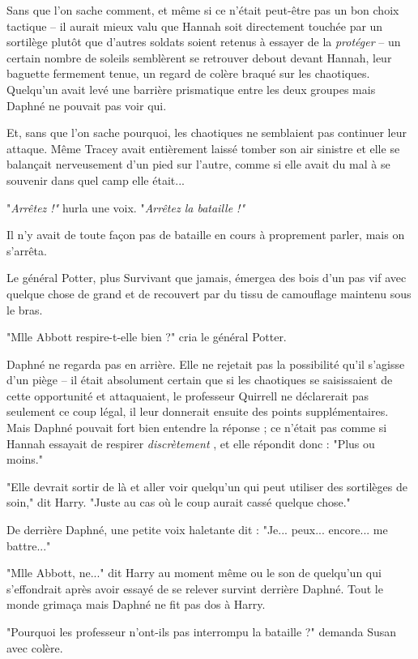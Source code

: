 Sans que l'on sache comment, et même si ce n'était peut-être pas un bon choix tactique – il aurait mieux valu que Hannah soit directement touchée par un sortilège plutôt que d'autres soldats soient retenus à essayer de la \emph{protéger}  – un certain nombre de soleils semblèrent se retrouver debout devant Hannah, leur baguette fermement tenue, un regard de colère braqué sur les chaotiques. Quelqu'un avait levé une barrière prismatique entre les deux groupes mais Daphné ne pouvait pas voir qui.

Et, sans que l'on sache pourquoi, les chaotiques ne semblaient pas continuer leur attaque. Même Tracey avait entièrement laissé tomber son air sinistre et elle se balançait nerveusement d'un pied sur l'autre, comme si elle avait du mal à se souvenir dans quel camp elle était...

"\emph{Arrêtez !"}  hurla une voix. "\emph{Arrêtez la bataille !"} 

Il n'y avait de toute façon pas de bataille en cours à proprement parler, mais on s'arrêta.

Le général Potter, plus Survivant que jamais, émergea des bois d'un pas vif avec quelque chose de grand et de recouvert par du tissu de camouflage maintenu sous le bras.

"Mlle Abbott respire-t-elle bien ?" cria le général Potter.

Daphné ne regarda pas en arrière. Elle ne rejetait pas la possibilité qu'il s'agisse d'un piège – il était absolument certain que si les chaotiques se saisissaient de cette opportunité et attaquaient, le professeur Quirrell ne déclarerait pas seulement ce coup légal, il leur donnerait ensuite des points supplémentaires. Mais Daphné pouvait fort bien entendre la réponse ; ce n'était pas comme si Hannah essayait de respirer \emph{discrètement} , et elle répondit donc : "Plus ou moins."

"Elle devrait sortir de là et aller voir quelqu'un qui peut utiliser des sortilèges de soin," dit Harry. "Juste au cas où le coup aurait cassé quelque chose."

De derrière Daphné, une petite voix haletante dit : "Je... peux... encore... me battre..."

"Mlle Abbott, ne..." dit Harry au moment même ou le son de quelqu'un qui s'effondrait après avoir essayé de se relever survint derrière Daphné. Tout le monde grimaça mais Daphné ne fit pas dos à Harry.

"Pourquoi les professeur n'ont-ils pas interrompu la bataille ?" demanda Susan avec colère.

